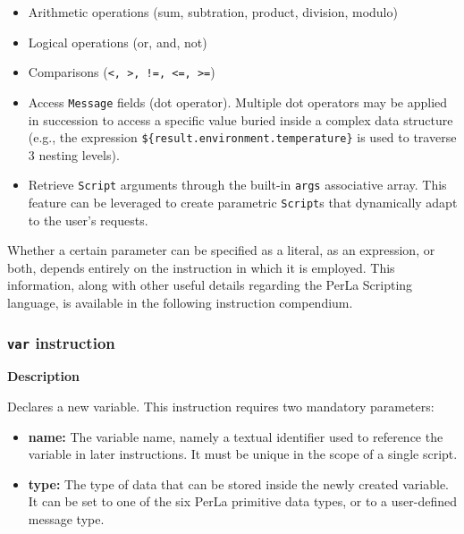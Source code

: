 \begin{itemize}
        
    \item Arithmetic operations (sum, subtration, product, division, modulo)

    \item Logical operations (or, and, not)

    \item Comparisons (\lstinline$<, >, !=, <=, >=$)

    \item Access \texttt{Message} fields (dot operator). Multiple dot operators
        may be applied in succession to access a specific value buried inside a
        complex data structure (e.g., the expression
        \lstinline!${result.environment.temperature}! is used to traverse 3
        nesting levels).

    \item Retrieve \texttt{Script} arguments through the built-in \texttt{args}
        associative array. This feature can be leveraged to create parametric
        \texttt{Script}s that dynamically adapt to the user's requests.

\end{itemize}

Whether a certain parameter can be specified as a literal, as an expression, or
both, depends entirely on the instruction in which it is employed. This
information, along with other useful details regarding the PerLa Scripting
language, is available in the following instruction compendium.

\subsubsection{\texttt{var} instruction}

\textbf{Description}

Declares a new variable. This instruction requires two mandatory parameters:

\begin{itemize}

    \item \textbf{name:} The variable name, namely a textual identifier used to
        reference the variable in later instructions. It must be unique in the
        scope of a single script.

    \item \textbf{type:} The type of data that can be stored inside the newly
        created variable. It can be set to one of the six PerLa primitive data
        types, or to a user-defined  message type.

\end{itemize}

